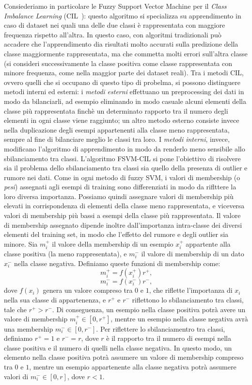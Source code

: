 \documentclass[oneside, openany]{book}
\begin{document}
	Consiederiamo in particolare le Fuzzy Support Vector Machine per il \textit{Class Imbalance Learning} (CIL~\cite{bib:cil}): questo algoritmo si specializza su apprendimento in caso di dataset nei quali una delle due classi è rappresentata con maggiore frequenza rispetto all'altra. In questo caso, con algoritmi tradizionali può accadere che l'apprendimento dia risultati molto accurati sulla predizione della classe maggiormente rappresentata, ma che commetta molti errori sull'altra classe (si consideri successivamente la classe positiva come classe rappresentata con minore frequenza, come nella maggior parte dei dataset reali).\newline
	Tra i metodi CIL, ovvero quelli che si occupano di questo tipo di probelma, si possono distinguere metodi interni ed esterni: i \textit{metodi esterni} effettuano un preprocessing dei dati in modo da bilanciarli, ad esempio eliminando in modo casuale alcuni elementi della classe più rappresentata finchè un determinato rapporto tra il numero degli elementi in ogni classe viene raggiunto; un altro metodo esterno consiste invece nella duplicazione degli esempi appartenenti alla classe meno rappresentata, sempre al fine di bilanciare meglio le classi tra loro. I \textit{metodi interni}, invece, modificano l'algoritmo di apprendimento in modo da renderlo meno sensibile allo sbilanciamento tra classi.\newline 
	L'algoritmo FSVM-CIL si pone l'obiettivo di risolvere sia il problema dello sbilanciamento tra classi sia quello della presenza di outlier e rumore nei dati. Come in ogni metodo di fuzzy SVM, i valori di membership (o \textit{pesi}) assegnati agli esempi di training sono differenziati in modo da riflttere la loro diversa importanza. Possiamo quindi assegnare valori di membership più elevati in corrispondenza di elementi della classe meno rappresentata, e viceversa valori di membership più bassi a esempi della classe più rappresentata. Il valore di membership assegnato dipende inoltre dall'importanza intra-classe dei diversi elementi del training set, in modo che l'effetto del rumore e degli outlier sia minore.\newline
	Sia $m_i^+$ il valore della membership di un esempio $x_i^+$ appartente alla classe positiva (la meno rappresentata), e $m_i^-$ il valore di membership di un dato $x_i^-$ nella classe negativa. Definiamo queste funzioni di membership come:
		\[
			m_i^+ = f(x_i^+)r^+\text{,}
		\]
		\[	
			m_i^- = f(x_i^-)r^-\text{,}
		\]
	dove $f(x_i)$ genera un valore compreso tra $0$ e $1$, che riflette l'importanza di $x_i$ nella sua classe di appartenenza, e $r^+$ e $r^-$ riflettono lo sbilanciamento tra classi, tale che $r^+>r^-$.	Di conseguenza, un esempio nella classe positiva potrà avere un valore di membership $m_i^+ \in [0,r^+]$, mentre un esempio nella classe negativa avrà una membership $m_i^- \in [0,r^-]$. Per riflettere lo sbilanciamentro tra classi, definiamo $r^+=1$ e $r^-=r$, dove $r$ è il rapporto tra il numero di esempi nella classe positiva e il numero di quelli nella classe negativa. In questo modo, un elemento nella classe positiva potrà assumere un valore di membership compreso tra $0$ e $1$, mentre un esempio appartenente alla classe negativa potrà assumere valori di $m_i^- \in [0,r]$, dove $r<1$.
\end{document}
